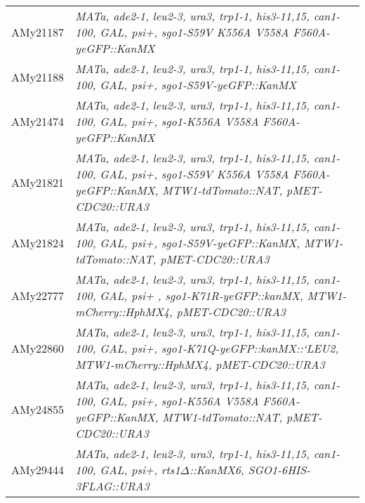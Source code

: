 \begin{longtable}{p{}p{}}
AMy21187        & \textit{MATa, ade2-1, leu2-3, ura3,   trp1-1, his3-11,15, can1-100, GAL, psi+, sgo1-S59V K556A V558A   F560A-yeGFP::KanMX}                                                                                                                             \\
AMy21188        & \textit{MATa, ade2-1, leu2-3, ura3,   trp1-1, his3-11,15, can1-100, GAL, psi+, sgo1-S59V-yeGFP::KanMX}                                                                                                                                                 \\
AMy21474        & \textit{MATa, ade2-1, leu2-3, ura3,   trp1-1, his3-11,15, can1-100, GAL, psi+, sgo1-K556A V558A F560A-yeGFP::KanMX}                                                                                                                                    \\
AMy21821        & \textit{MATa, ade2-1, leu2-3, ura3,   trp1-1, his3-11,15, can1-100, GAL, psi+, sgo1-S59V K556A V558A   F560A-yeGFP::KanMX, MTW1-tdTomato::NAT, pMET-CDC20::URA3}                                                                                       \\
AMy21824        & \textit{MATa, ade2-1, leu2-3, ura3,   trp1-1, his3-11,15, can1-100, GAL, psi+, sgo1-S59V-yeGFP::KanMX,   MTW1-tdTomato::NAT, pMET-CDC20::URA3}                                                                                                         \\
AMy22777        & \textit{MATa, ade2-1, leu2-3, ura3,   trp1-1, his3-11,15, can1-100, GAL, psi+ , sgo1-K71R-yeGFP::kanMX,   MTW1-mCherry::HphMX4, pMET-CDC20::URA3}                                                                                                      \\
AMy22860        & \textit{MATa, ade2-1, leu2-3, ura3,   trp1-1, his3-11,15, can1-100, GAL, psi+, sgo1-K71Q-yeGFP::kanMX::`LEU2,   MTW1-mCherry::HphMX4, pMET-CDC20::URA3}                                                                                                \\
AMy24855        & \textit{MATa, ade2-1, leu2-3, ura3,   trp1-1, his3-11,15, can1-100, GAL, psi+, sgo1-K556A V558A F560A-yeGFP::KanMX,   MTW1-tdTomato::NAT, pMET-CDC20::URA3}                                                                                            \\
AMy29444        & \textit{MATa, ade2-1, leu2-3, ura3,   trp1-1, his3-11,15, can1-100, GAL, psi+, rts1$\Delta$::KanMX6, SGO1-6HIS-3FLAG::URA3}                                                                                                                                   \\

\end{longtable}
